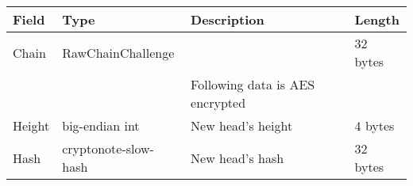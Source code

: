 \documentclass[a4paper,10pt]{article}
\begin{document}
                \noindent\begin{tabularx}{\textwidth}{|l|l|X|l|}
                    \hline Field & Type & Description & Length \\ \hline
                    \hline Chain & RawChainChallenge & & 32 bytes \\
                    \hline  & & Following data is AES encrypted & \\
                    \hline Height & big-endian int & New head's height & 4 bytes \\
                    \hline Hash & cryptonote-slow-hash & New head's hash & 32 bytes\\
                    \hline
                \end{tabularx}
\end{document}
